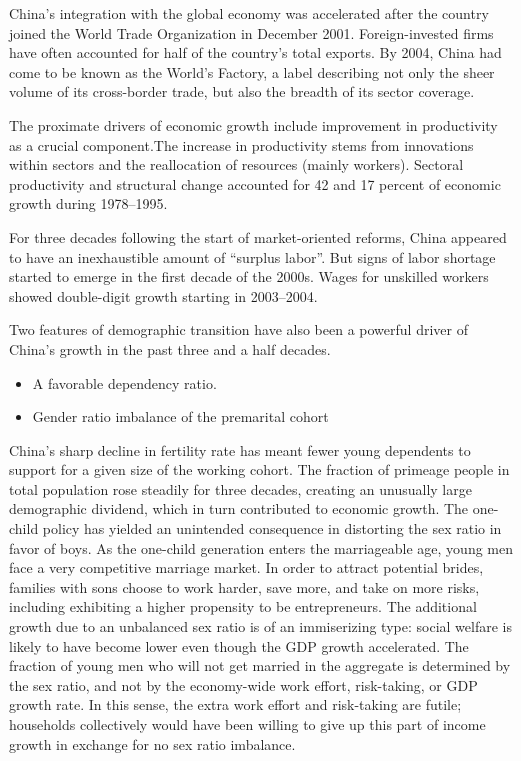 \documentclass{article}
\begin{document}
    China’s integration with the global economy was accelerated after the country joined the World Trade Organization in December 2001. Foreign-invested firms have often accounted for half of the country’s total exports. By 2004, China had come to be known as the World’s Factory, a label describing not only the sheer volume of its cross-border trade, but also the breadth of its sector coverage.

    The proximate drivers of economic growth include improvement in productivity as a crucial component.The increase in productivity stems from innovations within sectors and the reallocation of resources (mainly workers). Sectoral productivity and structural change accounted for 42 and 17 percent of economic growth during 1978–1995.

    For three decades following the start of market-oriented reforms, China appeared to have an inexhaustible amount of “surplus labor”. But signs of labor shortage started to emerge in the first decade of the 2000s. Wages for unskilled workers showed double-digit growth starting in 2003–2004.
    
    Two features of demographic transition have also been a powerful driver of China’s growth in the past three and a half decades.
    \begin{itemize}
        \item A favorable dependency ratio.
        \item Gender ratio imbalance of the premarital cohort
    \end{itemize}
    China’s sharp decline in fertility rate has meant fewer young dependents to support for a given size of the working cohort. The fraction of primeage people in total population rose steadily for three decades, creating an unusually large demographic dividend, which in turn contributed to economic growth. The one-child policy has yielded an unintended consequence in distorting the sex ratio in favor of boys. As the one-child generation enters the marriageable age, young men face a very competitive marriage market. In order to attract potential brides, families with sons choose to work harder, save more, and take on more risks, including exhibiting a higher propensity to be entrepreneurs. The additional growth due to an unbalanced sex ratio is of an immiserizing type: social welfare is likely to have become lower even though the GDP growth accelerated. The fraction of young men who will not get married in the aggregate is determined by the sex ratio, and not by the economy-wide work effort, risk-taking, or GDP growth rate. In this sense, the extra work effort and risk-taking are futile; households collectively would have been willing to give up this part of income growth in exchange for no sex ratio imbalance.
\end{document}
